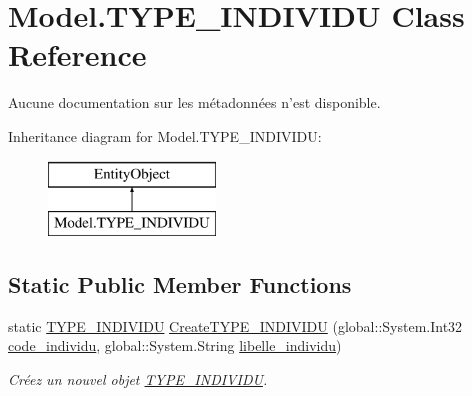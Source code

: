 \hypertarget{class_model_1_1_t_y_p_e___i_n_d_i_v_i_d_u}{\section{Model.\-T\-Y\-P\-E\-\_\-\-I\-N\-D\-I\-V\-I\-D\-U Class Reference}
\label{class_model_1_1_t_y_p_e___i_n_d_i_v_i_d_u}
}


Aucune documentation sur les métadonnées n'est disponible.  


Inheritance diagram for Model.\-T\-Y\-P\-E\-\_\-\-I\-N\-D\-I\-V\-I\-D\-U\-:\begin{figure}[H]
\begin{center}
\leavevmode
\includegraphics[height=2.000000cm]{class_model_1_1_t_y_p_e___i_n_d_i_v_i_d_u}
\end{center}
\end{figure}
\subsection*{Static Public Member Functions}
\begin{DoxyCompactItemize}
\item 
static \hyperlink{class_model_1_1_t_y_p_e___i_n_d_i_v_i_d_u}{T\-Y\-P\-E\-\_\-\-I\-N\-D\-I\-V\-I\-D\-U} \hyperlink{class_model_1_1_t_y_p_e___i_n_d_i_v_i_d_u_a058d2567052e838482d3326a7523f850}{Create\-T\-Y\-P\-E\-\_\-\-I\-N\-D\-I\-V\-I\-D\-U} (global\-::\-System.\-Int32 \hyperlink{class_model_1_1_t_y_p_e___i_n_d_i_v_i_d_u_a6e668e942f8ac11334e11d527a3c5823}{code\-\_\-individu}, global\-::\-System.\-String \hyperlink{class_model_1_1_t_y_p_e___i_n_d_i_v_i_d_u_a4d64f0dbaf0b613a4a85e723bd79fe7b}{libelle\-\_\-individu})
\begin{DoxyCompactList}\small\item\em Créez un nouvel objet \hyperlink{class_model_1_1_t_y_p_e___i_n_d_i_v_i_d_u}{T\-Y\-P\-E\-\_\-\-I\-N\-D\-I\-V\-I\-D\-U}. \end{DoxyCompactList}\end{DoxyCompactItemize}

